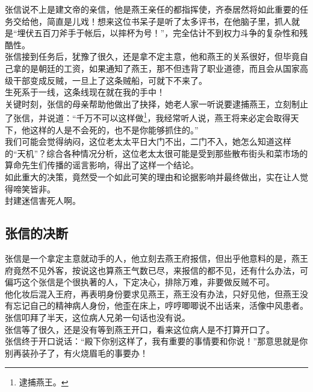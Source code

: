 \begin{multicols}{\theparacolNo}
张信说不上是建文帝的亲信，他是燕王亲任的都指挥使，齐泰居然将如此重要的任务交给他，简直是儿戏！想来这位书呆子是听了太多评书，在他脑子里，抓人就是“埋伏五百刀斧手于帐后，以摔杯为号！”，完全估计不到权力斗争的复杂性和残酷性。\\

张信接到任务后，犹豫了很久，还是拿不定主意，他和燕王的关系很好，但毕竟自己拿的是朝廷的工资，如果通知了燕王，那不但违背了职业道德，而且会从国家高级干部变成反贼，一旦上了这条贼船，可就下不来了。\\

生死系于一线，这条线现在就在我的手中！\\

关键时刻，张信的母亲帮助他做出了抉择，她老人家一听说要逮捕燕王，立刻制止了张信，并说道：“千万不可以这样做\footnote{逮捕燕王。}，我经常听人说，燕王将来必定会取得天下，他这样的人是不会死的，也不是你能够抓住的。”\\

我们可能会觉得纳闷，这位老太太平日大门不出，二门不入，她怎么知道这样的“天机”？综合各种情况分析，这位老太太很可能是受到那些散布街头和菜市场的算命先生们传播的谣言影响，得出了这样一个结论。\\

如此重大的决策，竟然受一个如此可笑的理由和论据影响并最终做出，实在让人觉得啼笑皆非。\\

封建迷信害死人啊。\\

\subsection{张信的决断}
张信是一个拿定主意就动手的人，他立刻去燕王府报信，但出乎他意料的是，燕王府竟然不见外客，按说这也算燕王气数已尽，来报信的都不见，还有什么办法，可偏巧这个张信是个很执著的人，下定决心，排除万难，非要做反贼不可。\\

他化妆后混入王府，再表明身份要求见燕王，燕王没有办法，只好见他，但燕王没有忘记自己的精神病人身份，他歪在床上，哼哼唧唧说不出话来，活像中风患者。张信叩拜了半天，这位病人兄弟一句话也没有说。\\

张信等了很久，还是没有等到燕王开口，看来这位病人是不打算开口了。\\

张信终于开口说话：“殿下你别这样了，我有重要的事情要和你说！”那意思就是你别再装孙子了，有火烧眉毛的事要办！\\


\end{multicols}
